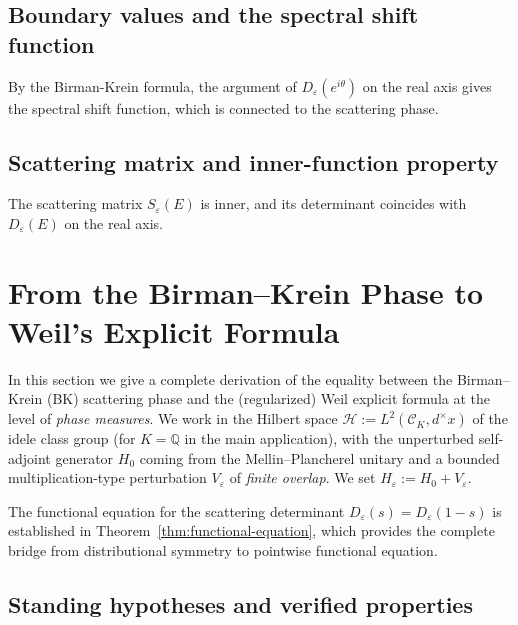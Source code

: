﻿\documentclass[12pt,a4paper]{article}
\theoremstyle{definition}
\theoremstyle{remark}
\begin{document}
\subsection{Boundary values and the spectral shift function}
By the Birman-Krein formula, the argument of $D_\varepsilon(e^{i\theta})$ on the real axis gives the spectral shift function, which is connected to the scattering phase.

\subsection{Scattering matrix and inner-function property}
The scattering matrix $S_\varepsilon(E)$ is inner, and its determinant coincides with $D_\varepsilon(E)$ on the real axis.


\section{From the Birman--Krein Phase to Weil's Explicit Formula}
\label{sec:BK-to-Weil}

In this section we give a complete derivation of the equality between the Birman--Krein (BK) scattering phase and the (regularized) Weil explicit formula at the level of \emph{phase measures}. We work in the Hilbert space $\mathcal{H}:=L^2(\mathcal{C}_K,d^\times x)$ of the idele class group (for $K=\mathbb{Q}$ in the main application), with the unperturbed self-adjoint generator $H_0$ coming from the Mellin--Plancherel unitary and a bounded multiplication-type perturbation $V_\varepsilon$ of \emph{finite overlap}. We set $H_\varepsilon:=H_0+V_\varepsilon$.

The functional equation for the scattering determinant $D_\varepsilon(s) = D_\varepsilon(1-s)$ is established in Theorem~\ref{thm:functional-equation}, which provides the complete bridge from distributional symmetry to pointwise functional equation.

\subsection{Standing hypotheses and verified properties}
\end{document}
